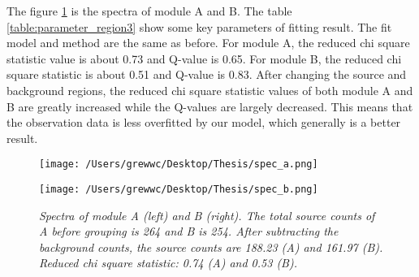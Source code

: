 \documentclass[12pt]{report}
\newcommand{\mycaption}[1]{\caption{\textit{\footnotesize #1}}}
\begin{document}
        \indent The figure \ref{fig:spectra_region3} is the spectra of module A and B. The table 
        \ref{table:parameter_region3}
        show some key parameters of fitting result. The fit model and method 
        are the same as before. For module A, the reduced chi square statistic value is about 0.73 and Q-value is 
        0.65. For module B, the reduced chi square statistic is about 0.51 and Q-value is 0.83. After changing the 
        source and background regions, the reduced chi square statistic values of both module A and B are greatly 
        increased while the Q-values are largely decreased. This means that the observation data is less overfitted
        by our model, which generally is a better result.  
        \begin{figure}[!ht]
          \begin{minipage}{0.45\textwidth}
            \begin{center} 
                \texttt{[image: /Users/grewwc/Desktop/Thesis/spec\_a.png]}
            \end{center}
            \end{minipage}
          \begin{minipage}{0.45\textwidth}
            \begin{center}
            \texttt{[image: /Users/grewwc/Desktop/Thesis/spec\_b.png]}
            \end{center}
          \end{minipage}
          \centering
          \begin{minipage}{0.8\textwidth}
          \mycaption{Spectra of module A (left) and B (right). The total source counts of A before grouping is 
                      264 and B is 254. After subtracting the background counts, the source counts are 188.23 (A)
                      and 161.97 (B). Reduced chi square statistic: 0.74 (A) and 0.53 (B).}
          \label{fig:spectra_region3}
          \end{minipage}
          \end{figure}
        
\end{document}

